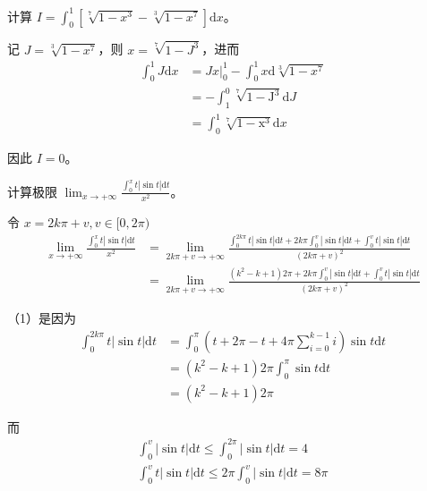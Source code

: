 \begin{ques}
	计算 $\displaystyle I=\int _{0}^{1}\left[\sqrt[7]{1-x^{3}} -\sqrt[3]{1-x^{7}}\right]\mathrm{d} x$。
\end{ques}

记 $\displaystyle J=\sqrt[3]{1-x^{7}}$，则 $\displaystyle x=\sqrt[7]{1-J^{3}}$，进而
\begin{align*}
	\int _{0}^{1} J\mathrm{d} x & = Jx | _{0}^{1} -\int _{0}^{1} x\mathrm{d}\sqrt[3]{1-x^{7}}\\
	& =-\int _{1}^{0}\mathrm{\sqrt[7]{1-J^{3}} d} J\ \\
	& =\int _{0}^{1}\mathrm{\sqrt[7]{1-x^{3}} d} x
\end{align*}


因此 $\displaystyle I=0$。







\begin{ques}
	计算极限 $\displaystyle \lim _{x\rightarrow +\infty }\frac{\int _{0}^{x} t|\sin t|\mathrm{d} t}{x^{2}}$。
\end{ques}



令 $\displaystyle x=2k\pi +v,v\in [ 0,2\pi )$
\begin{align*}
	\lim _{x\rightarrow +\infty }\frac{\int _{0}^{x} t|\sin t|\mathrm{d} t}{x^{2}} & =\lim _{2k\pi +v\rightarrow +\infty }\frac{\int _{0}^{2k\pi } t|\sin t|\mathrm{d} t+2k\pi \int _{0}^{v} |\sin t|\mathrm{d} t+\int _{0}^{v} t|\sin t|\mathrm{d} t}{( 2k\pi +v)^{2}}\\
	& =\lim _{2k\pi +v\rightarrow +\infty }\frac{\left( k^{2} -k+1\right) 2\pi +2k\pi \int _{0}^{v} |\sin t|\mathrm{d} t+\int _{0}^{v} t|\sin t|\mathrm{d} t}{( 2k\pi +v)^{2}}
\end{align*}

（1）是因为
\begin{align*}
	\int _{0}^{2k\pi } t|\sin t|\mathrm{d} t & =\int _{0}^{\pi }\left( t+2\pi -t+4\pi \sum _{i=0}^{k-1} i\right)\sin t\mathrm{d} t\\
	& =\left( k^{2} -k+1\right) 2\pi \int _{0}^{\pi }\sin t\mathrm{d} t\\
	& =\left( k^{2} -k+1\right) 2\pi 
\end{align*}

而 
\begin{gather*}
	\int _{0}^{v} |\sin t|\mathrm{d} t\leqslant \int _{0}^{2\pi } |\sin t|\mathrm{d} t=4\\
	\int _{0}^{v} t|\sin t|\mathrm{d} t\leqslant 2\pi \int _{0}^{v} |\sin t|\mathrm{d} t=8\pi 
\end{gather*}


